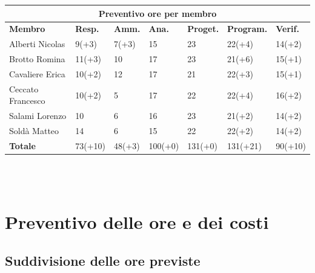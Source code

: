 \documentclass[a4paper, 12pt]{article}
\begin{document}
\begin{center}
	\begin{tabularx}{\textwidth}{|X|X|X|X|X|X|X|}
		\hline
		\multicolumn{7}{|c|}{\textbf{Preventivo ore per membro}}                                            \\
		\hline
		\hline
		\textbf{Membro}   & \textbf{Resp.}    & \textbf{Amm.}   & \textbf{Ana.} &
		\textbf{Proget.}  & \textbf{Program.} & \textbf{Verif.}                                             \\
		\hline
		Alberti Nicolas   & 9(+3)                 & 7(+3)               & 15            & 23  		 & 22(+4) 		 	& 14(+2)      \\
		\hline
		Brotto Romina     & 11(+3)                & 10              	& 17       		& 23    	 & 21(+6)       	& 15(+1) 	\\
		\hline
		Cavaliere Erica   & 10(+2)                & 12             		& 17        	& 21 		 & 22(+3)	 	 	& 15(+1)     \\
		\hline
		Ceccato Francesco & 10(+2)             	  & 5            		& 17            & 22 		 & 22(+4) 			& 16(+2)     \\
		\hline
		Salami Lorenzo    & 10	                & 6              		& 16     		& 23 		 & 21(+2)    	 	& 14(+2)	\\
		\hline
		Soldà Matteo      & 14                    & 6          			& 15            & 22    	 & 22(+2) 			& 14(+2)  	\\
		\hline
		\hline
		\textbf{Totale}   & 73(+10)            & 48(+3)          & 100(+0)        & 131(+0)		 & 131(+21) & 90(+10) \\
		\hline
	\end{tabularx}\\[8pt]
	\mbox{}\\
\end{center}

\newpage

\section{Preventivo delle ore e dei costi}

\subsection{Suddivisione delle ore previste}
\end{document}
